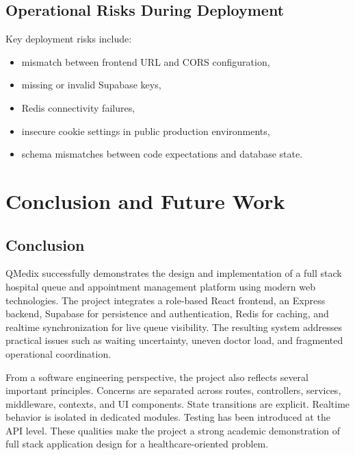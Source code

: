 \documentclass[12pt,onecolumn]{IEEEtran}
\let\oldsection\section
\renewcommand{\section}{\clearpage\oldsection}
\begin{document}
\subsection{Operational Risks During Deployment}
Key deployment risks include:
\begin{itemize}
    \item mismatch between frontend URL and CORS configuration,
    \item missing or invalid Supabase keys,
    \item Redis connectivity failures,
    \item insecure cookie settings in public production environments,
    \item schema mismatches between code expectations and database state.
\end{itemize}

\section{Conclusion and Future Work}
\subsection{Conclusion}
QMedix successfully demonstrates the design and implementation of a full stack hospital queue and appointment management platform using modern web technologies. The project integrates a role-based React frontend, an Express backend, Supabase for persistence and authentication, Redis for caching, and realtime synchronization for live queue visibility. The resulting system addresses practical issues such as waiting uncertainty, uneven doctor load, and fragmented operational coordination.

From a software engineering perspective, the project also reflects several important principles. Concerns are separated across routes, controllers, services, middleware, contexts, and UI components. State transitions are explicit. Realtime behavior is isolated in dedicated modules. Testing has been introduced at the API level. These qualities make the project a strong academic demonstration of full stack application design for a healthcare-oriented problem.
\end{document}
